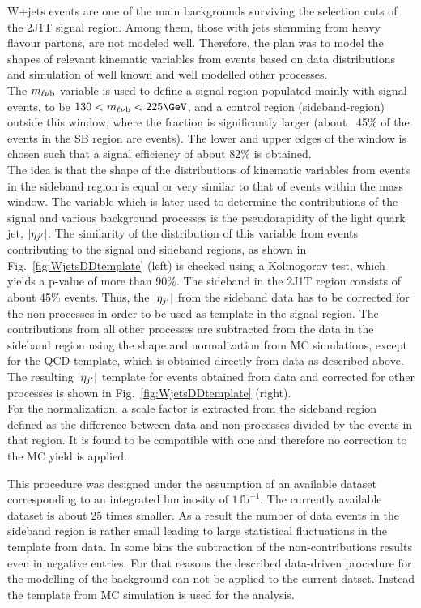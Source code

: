 W+jets events are one of the main backgrounds surviving the selection cuts of the 2J1T signal region. Among them, 
those with jets stemming from heavy flavour partons, are not modeled well. Therefore, the plan was to model the shapes of relevant kinematic variables from \wjets events 
 based on data distributions and simulation of well known and well modelled other processes.\\
The $m_{\ell\nu \mathrm{b}}$ variable is used to define a signal region populated mainly with signal events, to be 
$130<\topMass<225 \GeV$, and a control region (sideband-region) outside this window, where the \wjets fraction is significantly larger (about ~45\% of the events in the SB region are \wjets events). The lower and upper edges of the window is chosen such that a signal efficiency of about 82\% is obtained.\\
The idea is that the shape of the distributions of kinematic variables from \wjets events in the sideband region is equal or very similar to that of \wjets events within the mass window. The variable which is later used to determine the contributions of the signal and various background processes is the pseudorapidity of the light quark jet, $|\eta_{j^\prime}|$. The similarity of the distribution of this variable from \wjets events contributing to the signal and sideband regions, as shown in Fig.~\ref{fig:WjetsDDtemplate} (left) is checked using a Kolmogorov test, which yields a p-value of more than 90\%. 
The sideband in the 2J1T region consists of about 45\% \wjets events. Thus, the $|\eta_{j^\prime}|$ from the sideband data has to be corrected for the non-\wjets processes in order to be used as \wjets template in the signal region. The contributions from all other processes are subtracted from the data in the sideband region using the shape and normalization from MC simulations, except for the QCD-template, which is obtained directly from data as described above. The resulting $|\eta_{j^\prime}|$ template for \wjets events obtained from data and corrected for other processes is shown in Fig.~\ref{fig:WjetsDDtemplate} (right).\\
For the \wjets normalization, a scale factor is extracted from the sideband region defined as the difference between data and non-\wjets processes divided by the \wjets events in that region. It is found to be compatible with one and therefore no correction to the MC yield is applied.

This procedure was designed under the assumption of an available dataset corresponding to an integrated luminosity of $1\,\mathrm{fb}^{-1}$. The currently available dataset is about 25 times smaller. As a result the number of data events in the sideband region is rather small leading to large statistical fluctuations in the template from data. In some bins the subtraction of the non-\wjets contributions results even in negative entries. For that reasons the described data-driven procedure for the modelling of the \wjets background can not be applied to the current datset. Instead the \wjets template from MC simulation is used for the analysis.



